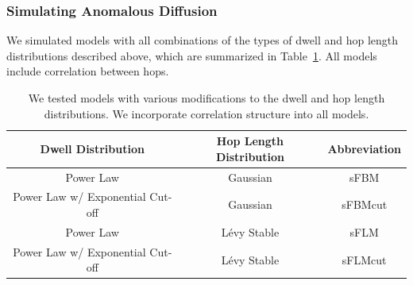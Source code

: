 \documentclass{article}
\begin{document}
  
  \subsubsection*{Simulating Anomalous Diffusion}

  We simulated models with all combinations of the types of dwell and hop length
  distributions described above, which are summarized in Table~\ref{table:anomalous_models}.
  All models include correlation between hops.

  \begin{table}[!htb]
	  \centering
	  \begin{tabular}{|c|c|c|}
	  \hline
	  Dwell Distribution                & Hop Length Distribution & Abbreviation \\
	  \hline
      Power Law                         & Gaussian                & sFBM         \\
      Power Law w/ Exponential Cut-off  & Gaussian                & sFBMcut      \\
      Power Law                         & L\'evy Stable           & sFLM         \\
      Power Law w/ Exponential Cut-off  & L\'evy Stable           & sFLMcut      \\
	  \hline
	  \end{tabular}
	  \caption{We tested models with various modifications to the dwell and hop
	  length distributions. We incorporate correlation structure into all models.}\label{table:anomalous_models}
 \end{table}
\end{document}

